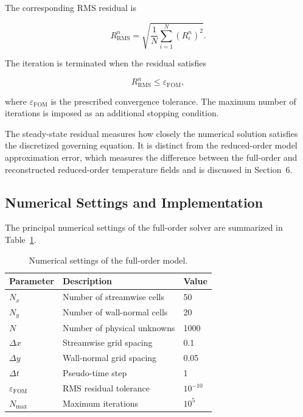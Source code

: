 The corresponding RMS residual is

\begin{equation}
    \boxed{
    R_{\mathrm{RMS}}^{n}
    =
    \sqrt{
    \frac{1}{N}
    \sum_{i=1}^{N}
    \left(R_i^n\right)^2
    }.
    }
    \label{eq:fom_residual_rms}
\end{equation}

The iteration is terminated when the residual satisfies

\begin{equation}
    R_{\mathrm{RMS}}^{n}
    \leq \varepsilon_{\mathrm{FOM}},
\end{equation}

where $\varepsilon_{\mathrm{FOM}}$ is the prescribed
convergence tolerance. The maximum number of iterations
is imposed as an additional stopping condition.

The steady-state residual measures how closely the
numerical solution satisfies the discretized governing
equation. It is distinct from the reduced-order model
approximation error, which measures the difference
between the full-order and reconstructed reduced-order
temperature fields and is discussed in Section~6.


\subsection{Numerical Settings and Implementation}

The principal numerical settings of the full-order solver
are summarized in Table~\ref{tab:fom_settings}.

\begin{table}[htbp]
    \centering
    \caption{Numerical settings of the full-order model.}
    \label{tab:fom_settings}
    \begin{tabular}{lll}
        \toprule
        \textbf{Parameter} &
        \textbf{Description} &
        \textbf{Value} \\
        \midrule
        $N_x$ & Number of streamwise cells & 50 \\
        $N_y$ & Number of wall-normal cells & 20 \\
        $N$ & Number of physical unknowns & 1000 \\
        $\Delta x$ & Streamwise grid spacing & 0.1 \\
        $\Delta y$ & Wall-normal grid spacing & 0.05 \\
        $\Delta t$ & Pseudo-time step & 1 \\
        $\varepsilon_{\mathrm{FOM}}$ & RMS residual tolerance & $10^{-10}$ \\
        $N_{\max}$ & Maximum iterations & $10^5$ \\
        \bottomrule
    \end{tabular}
\end{table}

